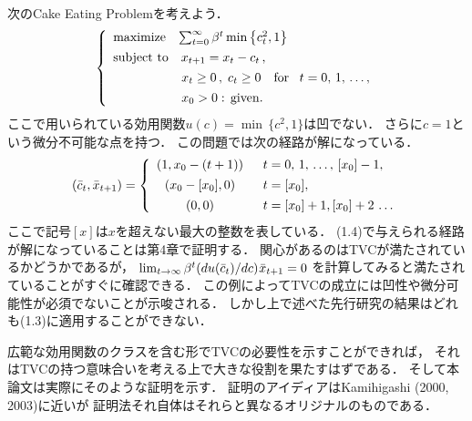 \documentclass[a4paper,11pt]{jsarticle}
\begin{document}
次のCake Eating Problemを考えよう．
\begin{align}
	\left\{
		\begin{array}{l}
			\mathrm{maximize} \hspace{3mm} \sum_{t=0}^\infty \beta^t \min \left\{ c_t^2,1\right\} \vspace{1.4mm}\\
			\mathrm{subject}\hspace{1.2mm}\mathrm{to}\quad x_{t+1}=x_t-c_t\,,\vspace{1.4mm}\\
			\vspace{1.4mm}
			\hspace{18.9mm}x_t \geq 0\,,\;c_t\geq 0 \quad \mathrm{for}\quad\! t=0,\,1,\,\ldots,\\
			\hspace{18.9mm}x_0 > 0 :\, \mathrm{given}.
		\end{array}
        \right.
\end{align}
ここで用いられている効用関数$u(c)=\min\,\{c^2,1\}$は凹でない．
さらに$c=1$という微分不可能な点を持つ．
この問題では次の経路が解になっている．
\begin{align}
	(\bar{c}_t,\bar{x}_{t+1})=
		\left\{
			\begin{array}{cl}
				(1,x_0-(t+1)) &\;\; t=0,\,1,\,\ldots,\,[x_0]-1,\vspace{1.4mm}\\
				(x_0-[x_0],0) &\;\; t=[x_0],\vspace{1.4mm}\\
				(0,0)	&\;\; t=[x_0]+1,[x_0]+2\,\ldots
			\end{array}
		\right.
\end{align}
ここで記号$[x]$は$x$を超えない最大の整数を表している．
(1.4)で与えられる経路が解になっていることは第4章で証明する．
関心があるのはTVCが満たされているかどうかであるが，
$\lim_{t \to \infty} \beta^t (du(\bar{c}_t)/dc) \hspace{.2mm} \bar{x}_{t+1}=0$
を計算してみると満たされていることがすぐに確認できる．
この例によってTVCの成立には凹性や微分可能性が必須でないことが示唆される．
しかし上で述べた先行研究の結果はどれも(1.3)に適用することができない．

広範な効用関数のクラスを含む形でTVCの必要性を示すことができれば，
それはTVCの持つ意味合いを考える上で大きな役割を果たすはずである．
そして本論文は実際にそのような証明を示す．
証明のアイディアはKamihigashi (2000, 2003)に近いが
証明法それ自体はそれらと異なるオリジナルのものである．
\end{document}
